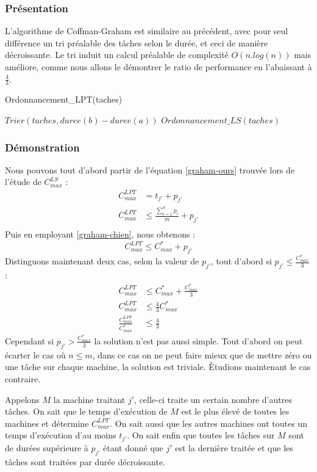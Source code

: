 \subsubsection{Présentation}
L'algorithme de Coffman-Graham est similaire au précédent, avec pour seul 
différence un tri préalable des tâches selon le durée, et ceci de manière 
décroissante. Le tri induit un calcul préalable de complexité $O(n.log(n))$ mais 
améliore, comme nous allons le démontrer le ratio de performance en l'abaissant 
à $\frac{4}{3}$.
\begin{algorithm}
\caption{Ordonnancement\_LPT(taches)}
\begin{algorithmic}
\STATE $Trier(taches, duree(b)-duree(a))$
\STATE $Ordonnancement\_LS(taches)$
\end{algorithmic}
\end{algorithm}
\subsubsection{Démonstration}
Nous pouvons tout d'abord partir de l'équation \eqref{graham-ours} trouvée lors 
de l'étude de $C^{LS}_{max}$ :
\begin{align}
C^{LPT}_{max} &= t_{j'} + p_{j'} \\
C^{LPT}_{max} &\leq \frac{\sum_{i=1}^n p_{i}}{m} + p_{j'} \\
\end{align}
Puis en employant \eqref{graham-chien}, nous obtenons :
\begin{equation}
C^{LPT}_{max} \leq C^*_{max} + p_{j'}
\end{equation}
Distinguons maintenant deux cas, selon la valeur de $p_{j'}$, tout d'abord si 
$p_{j'} \leq \frac{C^*_{max}}{3}$ :
\begin{align}
C^{LPT}_{max} &\leq C^*_{max} + \frac{C^*_{max}}{3} \\
C^{LPT}_{max} &\leq \frac{4}{3} C^*_{max} \\
\frac{C^{LPT}_{max}}{C^*_{max}} &\leq \frac{4}{3}
\end{align}
Cependant si $p_{j'} > \frac{C^*_{max}}{3}$ la solution n'est pas aussi simple.  
Tout d'abord on peut écarter le cas où $n\leq m$, dans ce cas on ne peut faire 
mieux que de mettre zéro ou une tâche sur chaque machine, la solution est 
triviale. Ètudions maintenant le cas contraire.

Appelons $M$ la machine traitant $j'$, celle-ci traite un certain nombre 
d'autres tâches. On sait que le temps d'exécution de $M$ est le plus élevé de 
toutes les machines et détermine $C^{LPT}_{max}$. On sait aussi que les autres 
machines ont toutes un temps d'exécution d'au moins $t_{j'}$. On sait enfin que  
toutes les tâches sur $M$ sont de durées supérieure à $p_{j'}$ étant donné que 
$j'$ est la dernière traitée et que les tâches sont traitées par durée 
décroissante.

